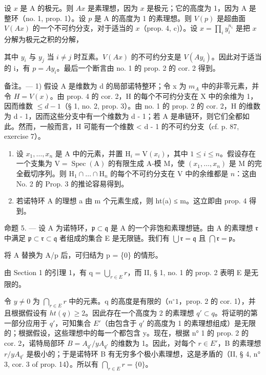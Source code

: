 设 \(x\) 是 A 的极元。则 \(Ax\) 是素理想，因为 \(x\) 是极元；它的高度为 1，因为 A 是整环（no. 1, prop. 1）。设 \(p\) 是 A 的高度为 1 的素理想。则 \(V(p)\) 是超曲面 \(V(Ax)\) 的一个不可约分支，对于适当的 \(x\)（prop. 4, c)）。设 \(x = \prod_{i} y_{i}^{n_i}\) 是把 \(x\) 分解为极元之积的分解，

其中 \(y_{i}\) 与 \(y_{j}\) 当 \(i \neq j\) 时互素。\(V(Ax)\) 的不可约分支是 \(V(Ay_{i})\)。因此对于适当的 i，有 \(p = Ay_{i}\)。最后一个断言由 no. 1 的 prop. 2 的 cor. 2 得到。

备注。--- 1) 假设 A 是维数为 d 的局部诺特整环；令 x 为 \(m_{A}\) 中的非零元素，并令 \(H = V(x)\)。由 prop. 4 的 cor. 2，H 的每个不可约分支在 X 中的余维为 1，因而维数 \(\leqslant d - 1\)（§ 1, no. 2, prop. 3）。由 no. 1 的 prop. 2 的 cor. 2，H 的维数为 d - 1，因而这些分支中有一个维数为 d - 1；若 A 是串链环，则它们全都如此。然而，一般而言，H 可能有一个维数 \textless{} d - 1 的不可约分支（cf. p. 87, exercise 7）。

\begin{enumerate}
\def\labelenumi{\arabic{enumi})}
\setcounter{enumi}{1}
\item
  设 \(x_1, \ldots, x_n\) 是 A 中的元素，并置 \(\mathrm{H}_i = \mathrm{V}(x_i)\)，其中 \(1 \leqslant i \leqslant n\)。假设存在一个支集为 \(\mathrm{V} = \operatorname{Spec}(\mathrm{A})\) 的有限生成 A-模 M，使 \((x_1, \ldots, x_n)\) 是 M 的完全截切序列。则 \(\mathrm{H}_1 \cap \ldots \cap \mathrm{H}_n\) 的每个不可约分支在 V 中的余维都是 \(n\)：这由 No. 2 的 Prop. 3 的推论容易得到。
\item
  若诺特环 A 的理想 a 由 m 个元素生成，则 ht(a) ≤ m。这立即由 prop. 4 得到。
\end{enumerate}

命题 5. --- 设 A 为诺特环，\(\mathfrak{p} \subset \mathfrak{q}\) 是 A 的一个非饱和素理想链。由 A 的素理想 \(\mathfrak{r}\) 中满足 \(\mathfrak{p} \subset \mathfrak{r} \subset \mathfrak{q}\) 者组成的集合 E 是无限链。我们有 \(\bigcup \mathfrak{r} = \mathfrak{q}\) 且 \(\bigcap \mathfrak{r} = \mathfrak{p}\)。

将 A 替换为 A/p 后，可归结为 p = \{0\} 的情形。

由 Section 1 的引理 1，有 q = \(\bigcup_{r \in E} r\)，而 II, § 1, no. 1 的 prop. 2 表明 E 是无限的。

令 \(y \neq 0\) 为 \(\bigcap_{r \in E} r\) 中的元素。q 的高度是有限的（\(n^{\circ}1\)，prop. 2 的 cor. 1），并且根据假设有 \(ht(q) \geqslant 2\)。因此存在一个高度为 2 的素理想 \(q' \subset q\)。将证明的第一部分应用于 \(q'\)，可知集合 \(E'\)（由包含于 \(q'\) 的高度为 1 的素理想组成）是无限的；根据假设，这些理想中的每一个都包含 y。现在，根据 n° 1 的 prop. 2 的 cor. 2，诺特局部环 \(B = A_{q'} / yA_{q'}\) 的维数为 1。因此，对每个 \(r \in E'\)，B 的素理想 \(r/yA_{q'}\) 是极小的；于是诺特环 B 有无穷多个极小素理想，这是矛盾的（II, § 4, n° 3, cor. 3 of prop. 14）。所以有 \(\bigcap_{r \in E} r = \{0\}\)。

